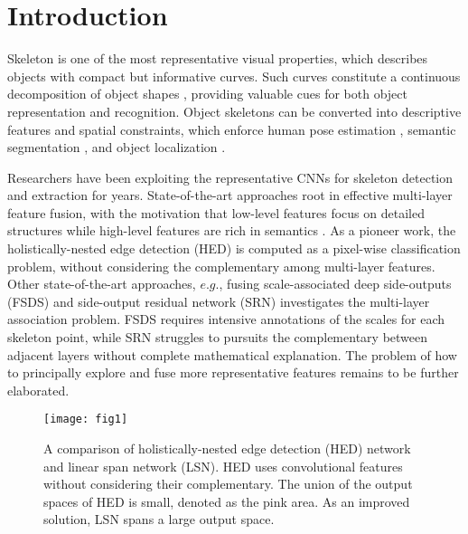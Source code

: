 \documentclass[runningheads]{llncs}
\begin{document}
\section{Introduction}

Skeleton is one of the most representative visual properties, which describes objects with compact but informative curves. Such curves constitute a continuous decomposition of object shapes \cite{ref31}, providing valuable cues for both object representation and recognition. Object skeletons can be converted into descriptive features and spatial constraints, which enforce human pose estimation \cite{ref4}, semantic segmentation \cite{ref16}, and object localization \cite{ref32}. 

Researchers have been exploiting the representative CNNs for skeleton detection and extraction \cite{ref1,ref6,ref7,ref33} for years. State-of-the-art approaches root in effective multi-layer feature fusion, with the motivation that low-level features focus on detailed structures while high-level features are rich in semantics \cite{ref1}. As a pioneer work, the holistically-nested edge detection (HED) \cite{ref6} is computed as a pixel-wise classification problem, without considering the complementary among multi-layer features. Other state-of-the-art approaches, $e.g.$, fusing scale-associated deep side-outputs (FSDS) \cite{ref7,ref33} and side-output residual network (SRN) \cite{ref1} investigates the multi-layer association problem. FSDS requires intensive annotations of the scales for each skeleton point, while SRN struggles to pursuits the complementary between adjacent layers without complete mathematical explanation. The problem of how to principally explore and fuse more representative features remains to be further elaborated.

\begin{figure}[t]
\centering
\texttt{[image: fig1]}
\caption{A comparison of holistically-nested edge detection (HED) network \cite{ref6} and linear span network (LSN). HED uses convolutional features without considering their complementary. The union of the output spaces of HED is small, denoted as the pink area. As an improved solution, LSN spans a large output space. }
\label{fig:shot}
\end{figure}
\end{document}
